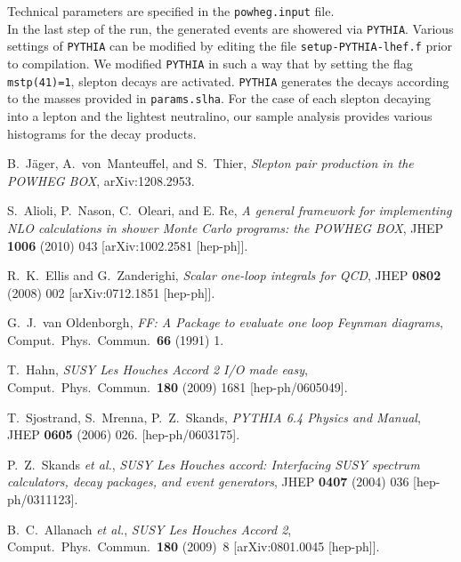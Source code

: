 \documentclass[a4paper,11pt]{article}
\begin{document}
Technical parameters are specified in the  {\tt powheg.input} file. 
\\[2ex] 
In the last step of the run, the generated events are showered via {\tt PYTHIA}. Various settings of {\tt PYTHIA}
can be modified by editing the file {\tt setup-PYTHIA-lhef.f} prior to compilation.
We modified {\tt PYTHIA} in such a way that by setting the flag {\tt mstp(41)=1}, slepton decays are activated.  
{\tt PYTHIA} generates the decays according to the masses provided in {\tt params.slha}.
For the case of each slepton decaying into a lepton and the lightest neutralino, our sample analysis provides various histograms for the decay products. 
%
%
\begin{thebibliography}{99}

 B.~J\"ager, A.~von~Manteuffel, and S.~Thier, {\em
  Slepton pair production in the POWHEG BOX}, arXiv:1208.2953. 
  
 S.~Alioli, P.~Nason, C.~Oleari, and E. Re, {\em
    A general framework for implementing NLO calculations in shower
    Monte Carlo programs: the POWHEG BOX}, JHEP {\bf 1006} (2010)
  043  [arXiv:1002.2581 [hep-ph]].

  R.~K.~Ellis and G.~Zanderighi,
  {\em Scalar one-loop integrals for QCD}, 
  JHEP {\bf 0802} (2008) 002
  [arXiv:0712.1851 [hep-ph]].

  G.~J.~van Oldenborgh,
 {\em FF: A Package to evaluate one loop Feynman diagrams}, 
  Comput.\ Phys.\ Commun.\  {\bf 66} (1991) 1.

  T.~Hahn,
  {\em SUSY Les Houches Accord 2 I/O made easy},  
  Comput.\ Phys.\ Commun.\  {\bf 180} (2009) 1681
  [hep-ph/0605049].

  T.~Sjostrand, S.~Mrenna, P.~Z.~Skands,
  {\em PYTHIA 6.4 Physics and Manual},
  JHEP {\bf 0605 } (2006)  026.
  [hep-ph/0603175]. 

  P.~Z.~Skands  {\it et al.},
  {\em SUSY Les Houches accord: Interfacing SUSY spectrum calculators, decay packages, and event generators},  
  JHEP {\bf 0407} (2004) 036
  [hep-ph/0311123].

  B.~C.~Allanach  {\it et al.},
  {\em SUSY Les Houches Accord 2}, 
  Comput.\ Phys.\ Commun.\  {\bf 180} (2009)~8
  [arXiv:0801.0045 [hep-ph]].

\end{thebibliography}
\end{document}
